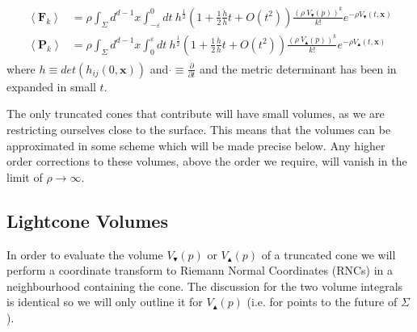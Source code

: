 \documentclass[12pt]{article}
\newcommand{\BF}[1]{\mathbf{F}_{#1}}
\newcommand{\BP}[1]{\mathbf{P}_{#1}}
\newcommand{\mb}[1]{\marginnote{\texttt{\small MB:\,#1}}}
\begin{document}
\begin{gather}\label{eq:nmax_and_eq:nmin}
\begin{aligned}
\left\langle \BF{k}\right\rangle & =\rho \int_{\Sigma}d^{d-1}x\int_{-\varepsilon}^{0}dt\:
h^{\frac{1}{2}}\left (1+
\frac{1}{2}\frac{\dot{h}}{h}t+O (t^2)\right)
 \frac{\left (\rho\: V_\blacktriangledown (p)\right)^k}{k!} e^{-\rho V_\blacktriangledown (t,\mathbf x)}
\\
\left\langle \BP{k}\right\rangle & =\rho \int_{\Sigma}d^{d-1}x\int_{0}^{\varepsilon}dt\:
h^{\frac{1}{2}}\left (1+
\frac{1}{2}\frac{\dot{h}}{h}t+O (t^2)\right) \frac{\left (\rho\: V_\blacktriangle (p)\right)^k}{k!} e^{-\rho V_\blacktriangle (t,\mathbf x)}
\end{aligned}
\end{gather}
where $h\equiv det\left (h_{ij} (0,\mathbf{x})\right)$ and $\dot{}\equiv \frac{\partial}{\partial t}$ and the metric determinant has been in expanded in small $t$.

The only truncated cones that contribute will have small volumes, as we are restricting ourselves close to the surface.
This means that the volumes can be approximated in some scheme which will be made precise below. Any higher order corrections to these volumes, above the order we require, will vanish in the limit of $\rho\rightarrow\infty$.

\subsection{Lightcone Volumes}

In order to evaluate the volume $V_\blacktriangledown (p)$ or $V_\blacktriangle (p)$ of a truncated cone we will perform a coordinate transform to Riemann Normal Coordinates (RNCs) in a neighbourhood containing the cone. The discussion for the two volume integrals is identical so we will only outline it for $V_\blacktriangle (p)$ (i.e. for points to the future of $\Sigma$). 
\end{document}
